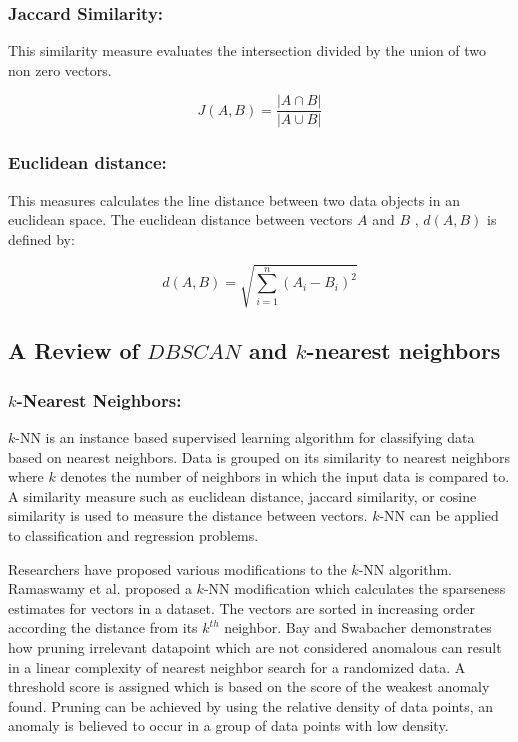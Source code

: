 \subsubsection{Jaccard Similarity:}
This similarity measure evaluates the intersection divided by the union of two non zero vectors.


\[ J(A,B) = \dfrac{|A \cap B | }{| A \cup B |} \]

\subsubsection{Euclidean distance:}
This measures calculates the line distance between two data objects in an euclidean space. The euclidean distance between vectors $A$ and $B$ , $d(A, B)$ is defined by: 

\[ d(A, B) =  \sqrt{\sum_{i=1}^n (A_i - B_i)^2} \]




\subsection{A Review of $DBSCAN$ and $k$-nearest neighbors}

\subsubsection{$k$-Nearest Neighbors:} $k$-NN is an instance based supervised learning algorithm for classifying data based on nearest neighbors. Data is grouped on its similarity to nearest neighbors where $k$ denotes the number of neighbors in which the input data is compared to.  A similarity measure such as euclidean distance, jaccard similarity, or cosine similarity is used to measure the distance between vectors. $k$-NN can be applied to classification and regression problems.

Researchers have proposed various modifications to the $k$-NN algorithm. Ramaswamy et al. \cite{Ramaswamy} proposed a $k$-NN modification which calculates the sparseness estimates for vectors in a dataset. The vectors are sorted in increasing order according the distance from its $k^{th}$ neighbor. Bay and Swabacher demonstrates how pruning irrelevant datapoint which are not considered anomalous can result in a linear complexity of nearest neighbor search for a randomized data. A threshold score is assigned which is based on the score of the weakest anomaly found. Pruning can be achieved by using the  relative density of data points, an anomaly is believed to occur in a group of data points with low density.


